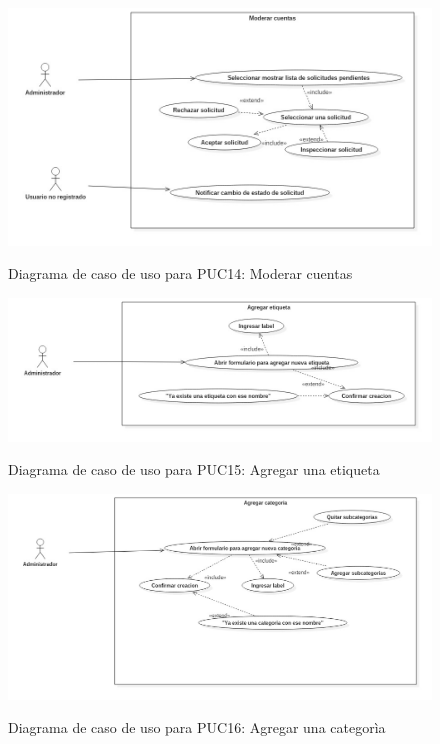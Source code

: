 \begin{figure}[!ht]
\includegraphics[width=\textwidth]{images/usecase/PUC14}
\label{FIG:CU_PUC14}
\caption{Diagrama de caso de uso para PUC14: Moderar cuentas}
\end{figure}

\begin{figure}[!ht]
\includegraphics[width=\textwidth]{images/usecase/PUC15}
\label{FIG:CU_PUC15}
\caption{Diagrama de caso de uso para PUC15: Agregar una etiqueta}
\end{figure}

\begin{figure}[!ht]
\includegraphics[width=\textwidth]{images/usecase/PUC16}
\label{FIG:CU_PUC16}
\caption{Diagrama de caso de uso para PUC16: Agregar una categor\`ia}
\end{figure}

